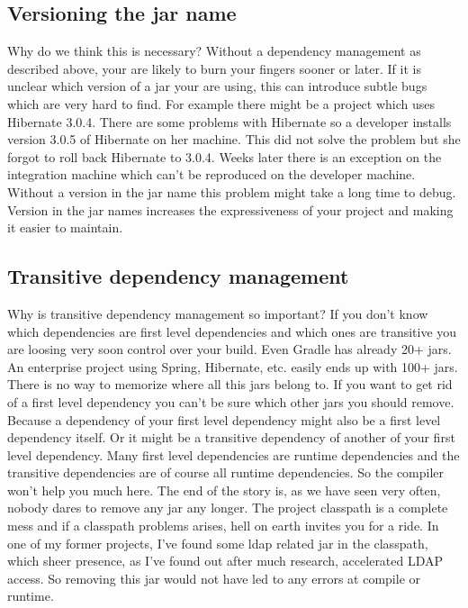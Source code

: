 \subsection{Versioning the jar name} %
\label{sub:versioning_the_jar_name}
Why do we think this is necessary? Without a dependency management as described above, your are likely to burn your fingers sooner or later. If it is unclear which version of a jar your are using, this can introduce subtle bugs which are very hard to find. For example there might be a project which uses Hibernate 3.0.4. There are some problems with Hibernate so a developer installs version 3.0.5 of Hibernate on her machine. This did not solve the problem but she forgot to roll back Hibernate to 3.0.4. Weeks later there is an exception on the integration machine which can't be reproduced on the developer machine. Without a version in the jar name this problem might take a long time to debug. Version in the jar names increases the expressiveness of your project and making it easier to maintain.

\subsection{Transitive dependency management} %
\label{sub:transitive_dependency_management}
Why is transitive dependency management so important? If you don't know which dependencies are first level dependencies and which ones are transitive you are loosing very soon control over your build. Even Gradle has already 20+ jars. An enterprise project using Spring, Hibernate, etc. easily ends up with 100+ jars. There is no way to memorize where all this jars belong to. If you want to get rid of a first level dependency you can't be sure which other jars you should remove. Because a dependency of your first level dependency might also be a first level dependency itself. Or it might be a transitive dependency of another of your first level dependency. Many first level dependencies are runtime dependencies and the transitive dependencies are of course all runtime dependencies. So the compiler won't help you much here. The end of the story is, as we have seen very often, nobody dares to remove any jar any longer. The project classpath is a complete mess and if a classpath problems arises, hell on earth invites you for a ride. In one of my former projects, I've found some ldap related jar in the classpath, which sheer presence, as I've found out after much research, accelerated LDAP access. So removing this jar would not have led to any errors at compile or runtime.


